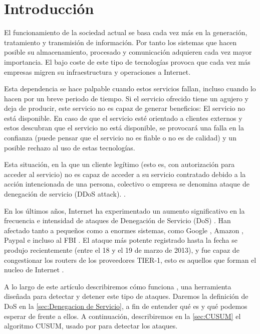 \section{Introducción}\label{introduccion}
El funcionamiento de la sociedad actual se basa cada vez más en la generación, tratamiento y transmisión de información.
Por tanto los sistemas que hacen posible su almacenamiento, procesado y comunicación adquieren cada vez mayor importancia.
El bajo coste de este tipo de tecnologías provoca que cada vez más empresas migren su infraestructura y operaciones a Internet.

Esta dependencia se hace palpable cuando estos servicios fallan, incluso cuando lo hacen por un breve periodo de tiempo. 
Si el servicio ofrecido tiene un agujero y deja de producir, este servicio no es capaz de generar beneficios: El servicio no
está disponible. En caso de que el servicio esté orientado a clientes externos y estos descubran que el servicio no está
disponible, se provocará una falla en la confianza (puede pensar que el servicio no es fiable o no es de calidad) y un posible
rechazo al uso de estas tecnologías.

Esta situación, en la que un cliente legítimo (esto es, con autorización para acceder al servicio) no es capaz de 
acceder a su servicio contratado debido a la acción intencionada de una persona, colectivo o empresa se denomina ataque 
de denegación de servicio (DDoS attack). \cite{Raghavan}.

En los últimos años, Internet ha experimentado un aumento significativo en la frecuencia e intensidad de ataques de
Denegación de Servicio (DoS) \cite{kakaspersky_2H2011_DDoS_analisis}. Han afectado tanto a pequeños como a enormes 
sistemas, como Google \cite{Google+_DDoS_attack}, Amazon \cite{Amazon_DDoS_attack}, Paypal e incluso al FBI 
\cite{FBI_DDoS_attack}. El ataque más potente registrado hasta la fecha se produjo recientemente (entre el 18 y el 19 de 
marzo de 2013), y fue capaz de congestionar los routers de los proveedores TIER-1, esto es aquellos que
forman el nucleo de Internet \cite{spamhaus_DDoS_attack}. 

A lo largo de este artículo describiremos cómo funciona \redborderddos, una herramienta diseñada 
para detectar y detener este tipo de ataques. Daremos la
definición de \gls{DoS} en la \autoref{sec:Denegacion de Servicio},
a fin de entender qué es y qué podemos esperar de \redborderddos{}
frente a ellos. A continuación, describiremos en la 
\autoref{sec:CUSUM} el algoritmo
CUSUM, usado por \redborderddos{} para detectar los ataques.

